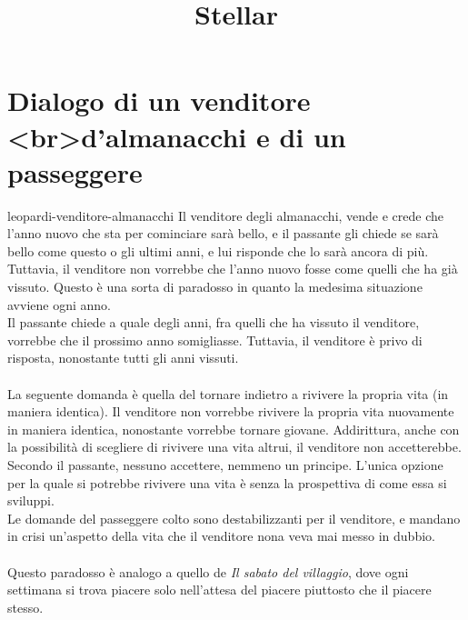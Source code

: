 \documentclass[preview]{standalone}
\begin{document}
\title{Stellar}
\genpage

\section{Dialogo di un venditore <br>d'almanacchi e di un passeggere}

\begin{snippet}{leopardi-venditore-almanacchi}
    Il venditore degli almanacchi, vende e crede che l'anno nuovo che sta per cominciare
    sarà bello, e il passante gli chiede se sarà bello come questo o gli ultimi anni, e
    lui risponde che lo sarà ancora di più. Tuttavia, il venditore non vorrebbe
    che l'anno nuovo fosse come quelli che ha già vissuto.
    Questo è una sorta di paradosso in quanto la medesima situazione avviene
    ogni anno.
    \\
    Il passante chiede a quale degli anni, fra quelli che ha vissuto il venditore, vorrebbe
    che il prossimo anno somigliasse.
    Tuttavia, il venditore è privo di risposta, nonostante tutti gli anni vissuti.
    \\\\
    La seguente domanda è quella del tornare indietro a rivivere la propria vita (in maniera identica).
    Il venditore non vorrebbe rivivere la propria vita nuovamente in maniera identica,
    nonostante vorrebbe tornare giovane.
    Addirittura, anche con la possibilità di scegliere di rivivere una vita altrui, il venditore
    non accetterebbe.
    Secondo il passante, nessuno accettere, nemmeno un principe.
    L'unica opzione per la quale si potrebbe rivivere una vita è senza la prospettiva di come
    essa si sviluppi.
    \\
    Le domande del passeggere colto sono destabilizzanti per il venditore, e mandano in crisi
    un'aspetto della vita che il venditore nona veva mai messo in dubbio.
    \\\\
    Questo paradosso è analogo a quello de \textit{Il sabato del villaggio}, 
    dove ogni settimana si trova piacere solo nell'attesa del piacere piuttosto
    che il piacere stesso.
    
\end{snippet}
\end{document}
